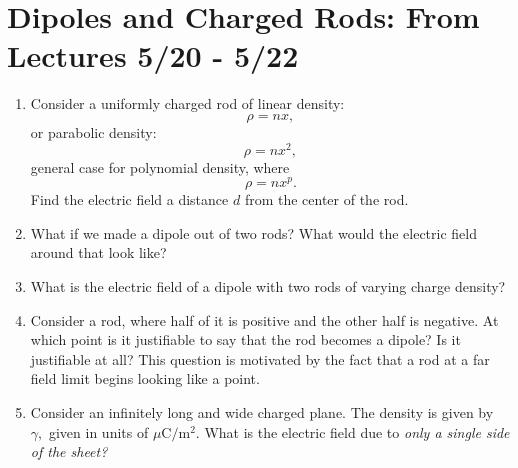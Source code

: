\documentclass[12pt]{extreport}
\begin{document}
\section{Dipoles and Charged Rods: From Lectures 5/20 - 5/22}
	\begin{enumerate}
		\item
		Consider a uniformly charged rod of linear density: $$\rho = nx,$$ or parabolic density: $$\rho = nx^2,$$ general case for polynomial density, where $$\rho = nx^p.$$ Find the electric field a distance $d$ from the center of the rod. 

		\item
		What if we made a dipole out of two rods? What would the electric field around that look like?

		\item
		What is the electric field of a dipole with two rods of varying charge density?

		\item
		Consider a rod, where half of it is positive and the other half is negative. At which point is it justifiable to say that the rod becomes a dipole? Is it justifiable at all? This question is motivated by the fact that a rod at a far field limit begins looking like a point.

		\item
		Consider an infinitely long and wide charged plane. The density is given by $\gamma,$ given in units of $\mu$C$/$m$^2.$ What is the electric field due to \textit{only a single side of the sheet?}

	\end{enumerate}

\end{document}
